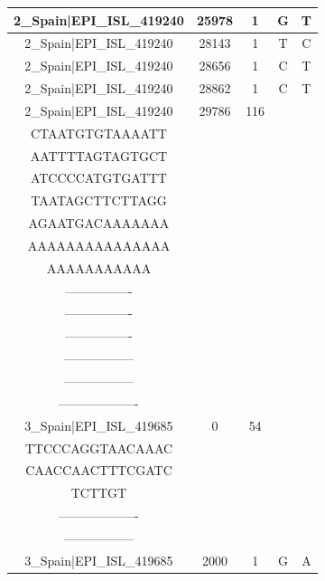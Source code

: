 \documentclass[a4paper,10pt]{article}
\begin{document}
\begin{longtable}{@{}ccccc@{}}
2\_Spain|EPI\_ISL\_419240 & 25978 & 1 & G & T \\* \midrule
2\_Spain|EPI\_ISL\_419240 & 28143 & 1 & T & C \\* \midrule
2\_Spain|EPI\_ISL\_419240 & 28656 & 1 & C & T \\* \midrule
2\_Spain|EPI\_ISL\_419240 & 28862 & 1 & C & T \\* \midrule
2\_Spain|EPI\_ISL\_419240 & 29786 & 116 & \begin{tabular}[c]{@{}c@{}}CTATATGGAAGAGCC\\ CTAATGTGTAAAATT\\ AATTTTAGTAGTGCT\\ ATCCCCATGTGATTT\\ TAATAGCTTCTTAGG\\ AGAATGACAAAAAAA\\ AAAAAAAAAAAAAAA\\ AAAAAAAAAAA\end{tabular} & \begin{tabular}[c]{@{}c@{}}---------------\\ ----------------\\ ----------------\\ ----------------\\ -----------------\\ -----------------\\ -------------------\end{tabular} \\* \midrule
3\_Spain|EPI\_ISL\_419685 & 0 & 54 & \begin{tabular}[c]{@{}c@{}}ATTAAAGGTTTATACC\\ TTCCCAGGTAACAAAC\\ CAACCAACTTTCGATC\\ TCTTGT\end{tabular} & \begin{tabular}[c]{@{}c@{}}------------------\\ -------------------\\ -----------------\end{tabular} \\* \midrule
3\_Spain|EPI\_ISL\_419685 & 2000 & 1 & G & A \\* \midrule

\end{longtable}
\end{document}
